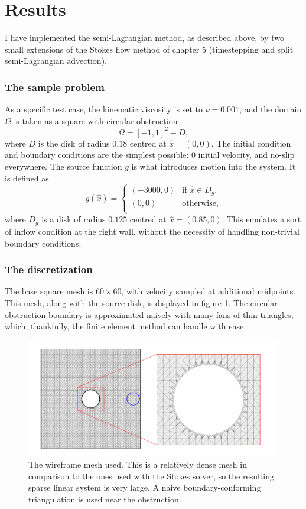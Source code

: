 \section{Results}
I have implemented the semi-Lagrangian method, as described above, by two small extensions
of the Stokes flow method of chapter 5
(timestepping and split semi-Lagrangian advection).
\subsubsection{The sample problem}
As a specific test case, the kinematic viscosity is set to $\nu = 0.001$, and
the domain $\Omega$ is taken as a square with circular obstruction
    $$\Omega = [-1,1]^2 - D,$$
where $D$ is the disk of radius $0.18$ centred at $\hat{x} = (0,0)$.
The initial condition and boundary conditions are the simplest possible: $0$ initial velocity, and no-slip everywhere.
The source function $g$ is what introduces motion into the system. It is defined as
$$
g(\hat{x}) = 
    \left\{\begin{array}{lr}
        (-3000, 0) &\text{if $\hat{x} \in D_g$},\\
        (0, 0) &\text{otherwise},\\
        \end{array}\right.
$$
where $D_g$ is a disk of radius $0.125$ centred at $\hat{x} = (0.85, 0)$.
This emulates a sort of inflow condition at the right wall, without the necessity of handling non-trivial boundary conditions.

\subsubsection{The discretization}
The base square mesh is $60 \times 60$, with velocity sampled at additional midpoints. This mesh, along with the source disk, is
displayed in figure \ref{navier_wireframe}. The circular obstruction boundary is approximated naively with many fans of thin triangles,
which, thankfully, the finite element method can handle with ease.

\begin{figure}[H]
    \centering
    \includegraphics[width=1\textwidth]{figures/navier_stokes/wireframe_full.png}
    \caption{\small
        The wireframe mesh used. This is a relatively dense mesh in comparison to the
        ones used with the Stokes solver, so the resulting sparse linear system is very large.
        A naive boundary-conforming triangulation is used near the obstruction.
    }
    \label{navier_wireframe}
\end{figure}


